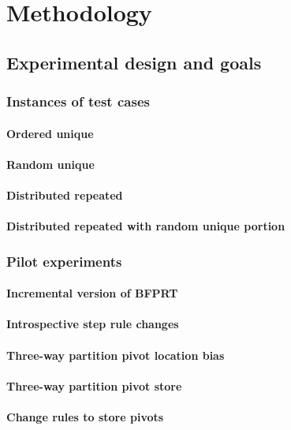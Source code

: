 \documentclass{iccmemoria}
\begin{document}
\chapter{Methodology}
\section{Experimental design and goals}
\subsection{Instances of test cases}
\subsubsection{Ordered unique}
\subsubsection{Random unique}
\subsubsection{Distributed repeated}
\subsubsection{Distributed repeated with random unique portion}
\subsection{Pilot experiments}
\subsubsection{Incremental version of BFPRT}
\subsubsection{Introspective step rule changes}
\subsubsection{Three-way partition pivot location bias}
\subsubsection{Three-way partition pivot store}
\subsubsection{Change rules to store pivots}
\end{document}
